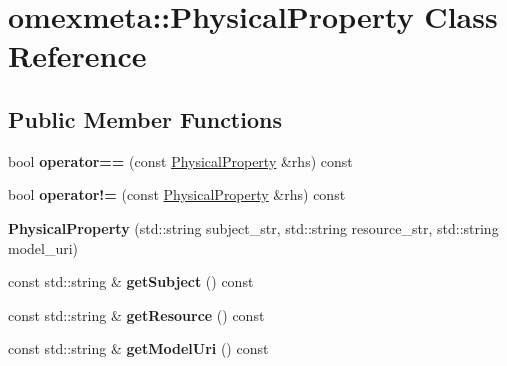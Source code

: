 \hypertarget{classomexmeta_1_1PhysicalProperty}{}\section{omexmeta\+:\+:Physical\+Property Class Reference}
\label{classomexmeta_1_1PhysicalProperty}
\subsection*{Public Member Functions}
\begin{DoxyCompactItemize}
\item 
\mbox{\label{classomexmeta_1_1PhysicalProperty_af3b3379a751ebb15f7a5ea0cae8cb4d6}} 
bool {\bfseries operator==} (const \hyperlink{classomexmeta_1_1PhysicalProperty}{Physical\+Property} \&rhs) const
\item 
\mbox{\label{classomexmeta_1_1PhysicalProperty_a1a85ba2c50f5b79e49e8a01b96756f0a}} 
bool {\bfseries operator!=} (const \hyperlink{classomexmeta_1_1PhysicalProperty}{Physical\+Property} \&rhs) const
\item 
\mbox{\label{classomexmeta_1_1PhysicalProperty_a76d1ffd15ea6aad76c322bdd8991a111}} 
{\bfseries Physical\+Property} (std\+::string subject\+\_\+str, std\+::string resource\+\_\+str, std\+::string model\+\_\+uri)
\item 
\mbox{\label{classomexmeta_1_1PhysicalProperty_acf399e14fd579efc6384ebc677341ead}} 
const std\+::string \& {\bfseries get\+Subject} () const
\item 
\mbox{\label{classomexmeta_1_1PhysicalProperty_a2d60b90270a6ba73646707b8c475fbb1}} 
const std\+::string \& {\bfseries get\+Resource} () const
\item 
\mbox{\label{classomexmeta_1_1PhysicalProperty_a0f27071bfef5a9de4eb89fb21461ba76}} 
const std\+::string \& {\bfseries get\+Model\+Uri} () const
\item 
\mbox{\label{classomexmeta_1_1PhysicalProperty_afd367b237fc93654c59c3b0c203b4640}} 

\end{DoxyCompactItemize}
